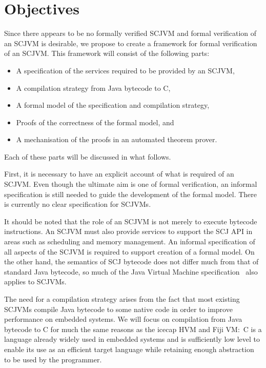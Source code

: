 \documentclass[a4paper,10pt]{report}
\let\olditem\item
\renewcommand{\item}[1][]{\olditem{\bfseries #1}}
\begin{document}
\section{Objectives}
\label{objectives-section}

Since there appears to be no formally verified SCJVM and formal
verification of an SCJVM is desirable, we propose to create a
framework for formal verification of an SCJVM.
This framework will consist of the following parts:
\begin{itemize}
\item A specification of the services required to be provided by an
  SCJVM,
\item A compilation strategy from Java bytecode to C,
\item A formal model of the specification and compilation strategy,
\item Proofs of the correctness of the formal model, and
\item A mechanisation of the proofs in an automated theorem prover.
\end{itemize}
Each of these parts will be discussed in what follows.

First, it is necessary to have an explicit account of what is required
of an SCJVM.
Even though the ultimate aim is one of formal verification, an
informal specification is still needed to guide the development of the
formal model.
There is currently no clear specification for SCJVMs.

It should be noted that the role of an SCJVM is not merely to execute
bytecode instructions.
An SCJVM must also provide services to support the SCJ API in areas
such as scheduling and memory management.
An informal specification of all aspects of the SCJVM is required to
support creation of a formal model.
On the other hand, the semantics of SCJ bytecode does not differ much
from that of standard Java bytecode, so much of the Java Virtual
Machine specification~\cite{lindholm2014} also applies to SCJVMs.

The need for a compilation strategy arises from the fact that most
existing SCJVMs compile Java bytecode to some native code in order to
improve performance on embedded systems.
We will focus on compilation from Java bytecode to C for much the same
reasons as the icecap HVM and Fiji VM:~C is a language already widely
used in embedded systems and is sufficiently low level to enable its
use as an efficient target language while retaining enough abstraction
to be used by the programmer.
\end{document}
